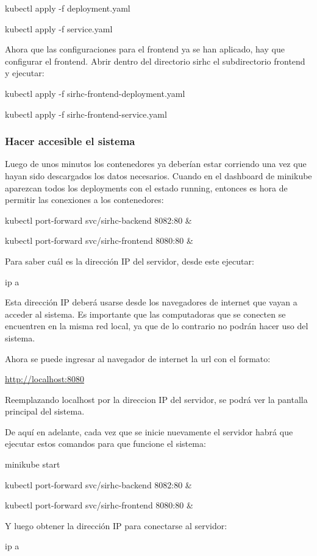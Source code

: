 \documentclass{article}
\begin{document}
kubectl apply -f deployment.yaml

kubectl apply -f service.yaml

Ahora que las configuraciones para el frontend ya se han aplicado, hay que configurar el frontend. Abrir dentro del directorio sirhc el subdirectorio frontend y ejecutar:

kubectl apply -f sirhc-frontend-deployment.yaml

kubectl apply -f sirhc-frontend-service.yaml

\subsubsection{Hacer accesible el sistema}
Luego de unos minutos los contenedores ya deberían estar corriendo una vez que hayan sido descargados los datos necesarios. Cuando en el dashboard de minikube aparezcan todos los deployments con el estado running, entonces es hora de permitir las conexiones a los contenedores:

kubectl port-forward svc/sirhc-backend 8082:80 \&

kubectl port-forward svc/sirhc-frontend 8080:80 \&

Para saber cuál es la dirección IP del servidor, desde este ejecutar:

ip a

Esta dirección IP deberá usarse desde los navegadores de internet que vayan a acceder al sistema. Es importante que las computadoras que se conecten se encuentren en la misma red local, ya que de lo contrario no podrán hacer uso del sistema.

Ahora se puede ingresar al navegador de internet la url con el formato:

\href{http://localhost:8080}{http://localhost:8080}

Reemplazando localhost por la direccion IP del servidor, se podrá ver la pantalla principal del sistema.

De aquí en adelante, cada vez que se inicie nuevamente el servidor habrá que ejecutar estos comandos para que funcione el sistema:

minikube start

kubectl port-forward svc/sirhc-backend 8082:80 \&

kubectl port-forward svc/sirhc-frontend 8080:80 \&

Y luego obtener la dirección IP para conectarse al servidor:

ip a
\end{document}
